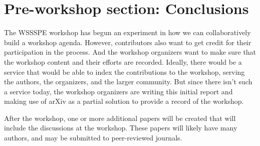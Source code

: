 \documentclass[11pt, oneside]{amsart}
\begin{document}
\section{Pre-workshop section: Conclusions}

The WSSSPE workshop has begun an experiment in how we can collaboratively build a workshop agenda.  However, contributors also want to get credit for their participation in the process.  And the workshop organizers want to make sure that the workshop content and their efforts are recorded.  Ideally, there would be a service that would be able to index the contributions to the workshop, serving the authors, the organizers, and the larger community.  But since there isn't such a service today, the workshop organizers are writing this initial report and making use of arXiv as a partial solution to provide a record of the workshop.

After the workshop, one or more additional papers will be created that will include the discussions at the workshop.  These papers will likely have many authors, and may be submitted to peer-reviewed journals.





\end{document}
